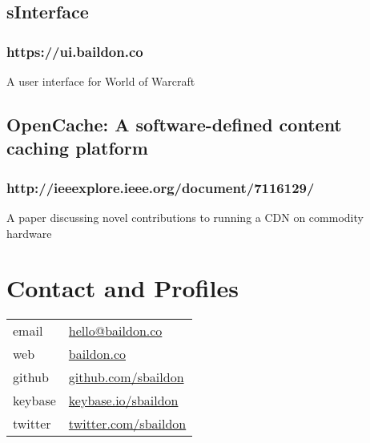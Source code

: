 \documentclass[a4paper,11pt]{article}
\begin{document}
\begin{multicols*}{2}
\subsection*{sInterface}
\subsubsection*{https://ui.baildon.co}
A user interface for World of Warcraft
\subsection*{OpenCache: A software-defined content caching platform}
\subsubsection*{http://ieeexplore.ieee.org/document/7116129/}
A paper discussing novel contributions to running a CDN on commodity hardware

\section*{Contact and Profiles}
\noindent \begin{tabular}{@{}ll}
email & \href{mailto:hello@baildon.co}{hello@baildon.co} \\
web & \href{https://baildon.co}{baildon.co} \\
github & \href{https://github.com/sbaildon}{github.com/sbaildon} \\
keybase & \href{https://keybase.io/sbaildon}{keybase.io/sbaildon} \\
twitter & \href{https://twitter.com/sbaildon}{twitter.com/sbaildon}
\end{tabular}

\end{multicols*}
\end{document}
